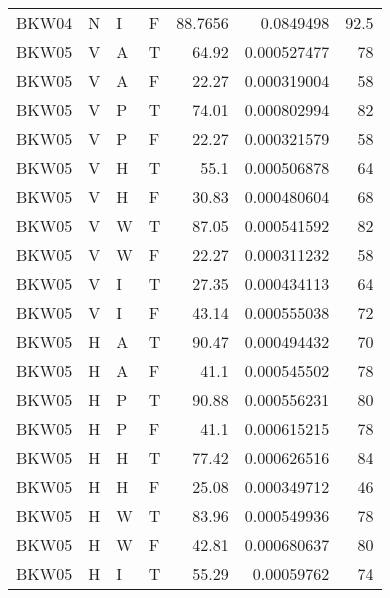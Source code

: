 \begin{longtable}{llllrrr}
    BKW04    & N         & I         & F          & 88.7656    & 0.0849498   & 92.5     \\
    BKW05    & V         & A         & T          & 64.92      & 0.000527477 & 78       \\
    BKW05    & V         & A         & F          & 22.27      & 0.000319004 & 58       \\
    BKW05    & V         & P         & T          & 74.01      & 0.000802994 & 82       \\
    BKW05    & V         & P         & F          & 22.27      & 0.000321579 & 58       \\
    BKW05    & V         & H         & T          & 55.1       & 0.000506878 & 64       \\
    BKW05    & V         & H         & F          & 30.83      & 0.000480604 & 68       \\
    BKW05    & V         & W         & T          & 87.05      & 0.000541592 & 82       \\
    BKW05    & V         & W         & F          & 22.27      & 0.000311232 & 58       \\
    BKW05    & V         & I         & T          & 27.35      & 0.000434113 & 64       \\
    BKW05    & V         & I         & F          & 43.14      & 0.000555038 & 72       \\
    BKW05    & H         & A         & T          & 90.47      & 0.000494432 & 70       \\
    BKW05    & H         & A         & F          & 41.1       & 0.000545502 & 78       \\
    BKW05    & H         & P         & T          & 90.88      & 0.000556231 & 80       \\
    BKW05    & H         & P         & F          & 41.1       & 0.000615215 & 78       \\
    BKW05    & H         & H         & T          & 77.42      & 0.000626516 & 84       \\
    BKW05    & H         & H         & F          & 25.08      & 0.000349712 & 46       \\
    BKW05    & H         & W         & T          & 83.96      & 0.000549936 & 78       \\
    BKW05    & H         & W         & F          & 42.81      & 0.000680637 & 80       \\
    BKW05    & H         & I         & T          & 55.29      & 0.00059762  & 74       \\

\end{longtable}
